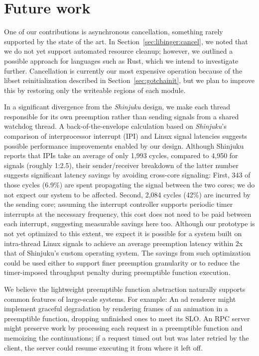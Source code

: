 \section{Future work}

One of our contributions is asynchronous cancellation, something rarely supported by
the state of the art.  In Section~\ref{sec:libinger:cancel}, we noted that we do not
yet support automated resource cleanup; however, we outlined a possible approach for
languages such as Rust, which we intend to investigate further.  Cancellation is
currently
our most expensive operation because of the libset reinitialization described in
Section~\ref{sec:gotchainit}, but we plan to improve this by restoring only the
writeable regions of each module.

In a significant divergence from the \textit{Shinjuku} design, we make each thread
responsible for its own preemption rather than sending signals from a shared watchdog
thread.  A back-of-the-envelope calculation based on \textit{Shinjuku}'s comparison of
interprocessor interrupt (IPI) and Linux signal latencies suggests possible
performance improvements enabled by our design.
Although Shinjuku reports that IPIs take an average of only 1,993 cycles, compared to
4,950 for signals (roughly 1:2.5), their sender/receiver breakdown of the latter
number suggests significant latency savings by avoiding cross-core signaling:
First, 343 of those cycles (6.9\%) are spent propagating the signal between the two
cores; we do not expect our system to be affected.  Second, 2,084 cycles (42\%)
are incurred by the sending core; assuming the interrupt controller supports
periodic timer interrupts at the necessary frequency, this cost does not need to be
paid between each interrupt, suggesting measurable savings here too.  Although
our prototype is not yet optimized to this extent, we expect it is possible for a
system built on intra-thread Linux signals to achieve an average preemption latency
within 2x that of Shinjuku's custom operating system.  The savings from such
optimization could be used either to support finer preemption granularity or to
reduce the timer-imposed throughput penalty during preemptible function execution.

We believe the lightweight preemptible function abstraction naturally supports
common features of large-scale systems.  For example:  An ad renderer might implement
graceful degradation by rendering frames of an animation in a preemptible function,
dropping unfinished ones to meet its SLO.  An RPC server might preserve work by
processing each request in a preemptible function and memoizing the continuations; if
a request timed out but was later retried by the client, the server could resume
executing it from where it left off.

